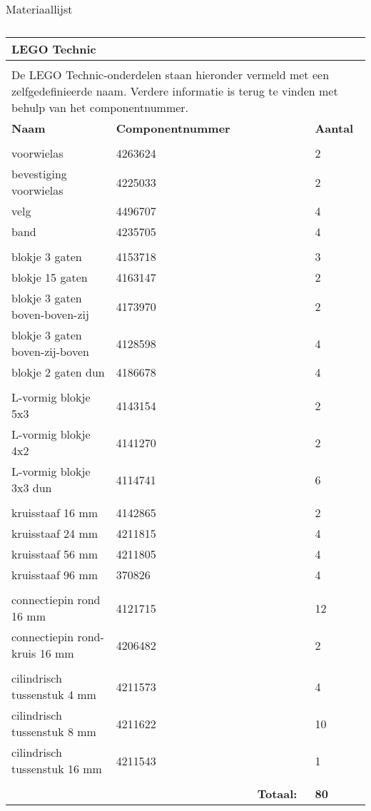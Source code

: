 \begin{center}
\begin{table}
\begin{tabular}{| p{3cm} | l | p{3cm} | p{2cm} | p{2cm}|}
\end{tabular}
\caption[Materiaallijst]{Materiaallijst}
\label{table:materiaallijst}
\end{table}
\begin{table}
 \begin{tabular}{|l|l|l|l|}
 \hline
\textbf{LEGO Technic} &  &  & \\\hline
 &  &  & \\\hline
\multicolumn{4}{|p{10cm}|}{De LEGO Technic-onderdelen staan hieronder vermeld 
met een zelfgedefinieerde naam. Verdere informatie is terug te vinden met behulp 
van het componentnummer.} \\\hline
\textbf{Naam} & \textbf{Componentnummer} &  & \textbf{Aantal} \\\hline
 &  &  & \\\hline
voorwielas & 4263624 &  & 2\\\hline
bevestiging voorwielas & 4225033 &  & 2\\\hline
velg & 4496707 &  & 4\\\hline
band & 4235705 &  & 4\\\hline
 &  &  & \\\hline
blokje 3 gaten & 4153718 &  & 3\\\hline
blokje 15 gaten & 4163147 &  & 2\\\hline
blokje  3 gaten boven-boven-zij & 4173970 &  & 2\\\hline
blokje 3 gaten boven-zij-boven & 4128598 &  & 4\\\hline
blokje 2 gaten dun & 4186678 &  & 4\\\hline
 &  &  & \\\hline
L-vormig blokje 5x3 & 4143154 &  & 2\\\hline
L-vormig blokje 4x2 & 4141270 &  & 2\\\hline
L-vormig blokje 3x3 dun & 4114741 &  & 6\\\hline
 &  &  & \\\hline
kruisstaaf 16 mm & 4142865 &  & 2\\\hline
kruisstaaf 24 mm & 4211815 &  & 4\\\hline
kruisstaaf 56 mm & 4211805 &  & 4\\\hline
kruisstaaf 96 mm & 370826 &  & 4\\\hline
 &  &  & \\\hline
connectiepin rond 16 mm & 4121715 &  & 12\\\hline
connectiepin rond-kruis 16 mm & 4206482 &  & 2\\\hline
 &  &  & \\\hline
cilindrisch tussenstuk 4 mm & 4211573 &  & 4\\\hline
cilindrisch tussenstuk 8 mm & 4211622 &  & 10\\\hline
cilindrisch tussenstuk 16 mm & 4211543 &  & 1\\\hline
 &  &  & \\\hline
 &  & \textbf{Totaal: }& \textbf{80}\\\hline


\end{tabular}
\end{table}
\end{center}
